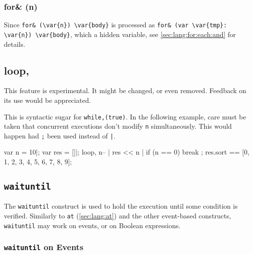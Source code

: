 
\subsubsection{for\& (n)}

Since \lstinline|for& (\var{n}) \var{body}| is processed as
\lstinline|for& (var \var{tmp}: \var{n}) \var{body}|, which 
a hidden variable, see \autoref{sec:lang:for:each:and} for details.


\subsection{loop,}
\begin{note}
  This feature is experimental.  It might be changed, or even removed.
  Feedback on its use would be appreciated.
\end{note}

This is syntactic sugar for \lstinline|while,(true)|.  In the
following example, care must be taken that concurrent executions don't
modify \lstinline|n| simultaneously.  This would happen had
\lstinline|;| been used instead of \lstinline'|'.

\begin{urbiassert}[firstnumber=last]
{
  var n = 10|;
  var res = []|;
  loop,
  {
    n-- |
    res << n |
    if (n == 0)
      break
  };
  res.sort
}
==
[0, 1, 2, 3, 4, 5, 6, 7, 8, 9];
\end{urbiassert}

\subsection{\lstinline|waituntil|}
\label{sec:lang:waituntil}

The \lstinline|waituntil| construct is used to hold the execution
until some condition is verified.  Similarly to \lstinline|at|
(\autoref{sec:lang:at}) and the other event-based constructs,
\lstinline|waituntil| may work on events, or on Boolean expressions.

\subsubsection{\lstinline'waituntil' on Events}


